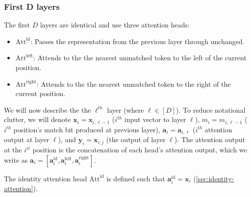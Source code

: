 \subsubsection{First D layers}
The first $D$ layers are identical and use three attention heads:\begin{itemize}
    \item $\mathrm{Att}^{\mathrm{id}}$: Passes the representation from the previous layer through unchanged.
    \item $\mathrm{Att}^{\mathrm{left}}$: Attends to the the nearest unmatched token to the left of the current position.
    \item $\mathrm{Att}^{\mathrm{right}}$: Attends to the the nearest unmatched token to the right of the current position.
\end{itemize}

We will now describe the the $\ell^{\mathit{th}}$ layer (where $\ell \in [D]$). 
To reduce notational clutter, we will denote $\mathbf{x}_{i}=\mathbf{x}_{i,\ell-1}$ ($i^\mathit{th}$ input vector to layer $\ell$), $m_i = m_{i,\ell-1}$ ($i^\mathit{th}$ position's match bit produced at previous layer), $\mathbf{a}_i=\mathbf{a}_{i,\ell}$ ($i^\mathit{th}$ attention output at layer $\ell$), and $\mathbf{y}_{i} = \mathbf{x}_{i,j}$ (the output of layer $\ell$). The attention output at the $i^{\mathit{it}}$ position is the concatenation of each head's attention output, which we write as $\mathbf{a}_{i} = [\mathbf{a}_{i}^{\mathrm{id}}, \mathbf{a}_{i}^{\mathrm{left}}, \mathbf{a}_{i}^{\mathrm{right}}]$.

The identity attention head $\mathrm{Att}^{\mathrm{id}}$ is defined such that $\mathbf{a}_{i}^{\mathrm{id}} = \mathbf{x}_i$ (\cref{sec:identity-attention}).

